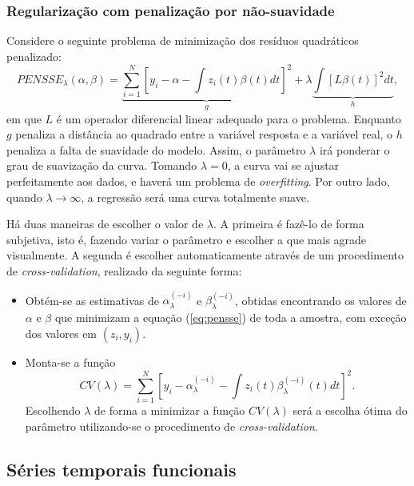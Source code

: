 \documentclass[
	12pt,				%
	openright,			%
	oneside,			%
	a4paper,			%
	english,			%
	brazil				%
	]{dissertacao-ufrgs-abntex2}
\begin{document}
\subsubsection*{Regularização com penalização por não-suavidade}

Considere o seguinte problema de minimização dos resíduos quadráticos
penalizado:
\begin{equation}
PENSSE_{\lambda}(\alpha,\beta)=\underbrace{\sum_{i=1}^{N}[y_{i}-\alpha-\int z_{i}(t)\beta(t)dt]^{2}}_{g}+\lambda\underbrace{\int[L\beta(t)]^{2}dt}_{h},\label{eq:pensse}
\end{equation}
em que $L$ é um operador diferencial linear adequado para o problema.
Enquanto $g$ penaliza a distância ao quadrado entre a variável resposta
e a variável real, o $h$ penaliza a falta de suavidade do modelo.
Assim, o parâmetro $\lambda$ irá ponderar o grau de suavização da
curva. Tomando $\lambda=0$, a curva vai se ajustar perfeitamente
aos dados, e haverá um problema de \emph{overfitting}. Por outro lado,
quando $\lambda\rightarrow\infty$, a regressão será uma curva totalmente
suave.

Há duas maneiras de escolher o valor de $\lambda$. A primeira é fazê-lo
de forma subjetiva, isto é, fazendo variar o parâmetro e escolher
a que mais agrade visualmente. A segunda é escolher automaticamente
através de um procedimento de \emph{cross-validation},
realizado da seguinte forma:
\begin{itemize}
\item Obtém-se as estimativas de $\alpha_{\lambda}^{(-i)}$ e $\beta_{\lambda}^{(-i)}$,
obtidas encontrando os valores de $\alpha$ e $\beta$ que minimizam
a equação (\ref{eq:pensse}) de toda a amostra, com exceção dos valores
em $(z_{i},y_{i})$. 
\item Monta-se a função 
\[
CV(\lambda)=\sum_{i=1}^{N}[y_{i}-\alpha_{\lambda}^{(-i)}-\int z_{i}(t)\beta_{\lambda}^{(-i)}(t)dt]^{2}.
\]
Escolhendo $\lambda$ de forma a minimizar a função $CV(\lambda)$
será a escolha ótima do parâmetro utilizando-se o procedimento de
\emph{cross-validation}.
\end{itemize}

\subsection{Séries temporais funcionais}
\end{document}
